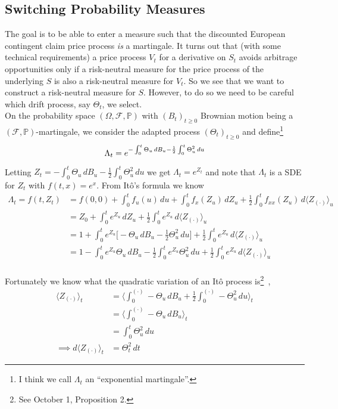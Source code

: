 \documentclass[12pt]{article}
\newlength\tindent
\renewcommand{\indent}{\hspace*{\tindent}}
\begin{document}
\subsection{Switching Probability Measures}

\indent The goal is to be able to enter a measure such that the discounted European contingent claim price process {\em is} a martingale. It turns out that (with some technical requirements) a price process $V_t$ for a derivative on $S_t$ avoids arbitrage opportunities only if a risk-neutral measure for the price process of the underlying $S$ is also a risk-neutral measure for $V_t$. So we see that we want to construct a risk-neutral measure for $S$. However, to do so we need to be careful which drift process, say $\Theta_t$, we select. \\

\indent On the probability space $(\Omega, \mathcal F,\mathbb P)$ with $(B_t)_{t\geq0}$ Brownian motion being a $(\mathcal F,\mathbb P)$-martingale, we consider the adapted process $(\Theta_t)_{t\geq0}$ and define\footnote{I think we call $\Lambda_t$ an ``exponential martingale''.}
\begin{equation*}
	\Lambda_t = e^{-\int^t_0\Theta_u\,dB_u - \frac{1}{2}\int^t_0 \Theta_u^2\,du } \\
\end{equation*}

\indent Letting $Z_t = -\int^t_0\Theta_u\,dB_u - \frac{1}{2}\int^t_0 \Theta_u^2\,du$ we get $\Lambda_t = e^{Z_t}$ and note that $\Lambda_t$ is a SDE for $Z_t$ with $f(t,x) = e^x$. From It\^{o}'s formula we know
\begin{align*}
	\Lambda_t = f(t,Z_t) &= f(0,0) + \int^t_0 f_u(u)\,du + \int^t_0 f_x(Z_u)\,dZ_u + \frac{1}{2}\int^t_0 f_{xx}(Z_u)\,d\langle Z_{(\cdot)}\rangle_u \\
	&= Z_0 + \int^t_0 e^{Z_u} \,dZ_u + \frac{1}{2}\int^t_0 e^{Z_u} \,d\langle Z_{(\cdot)}\rangle_u \\
	&= 1 + \int^t_0 e^{Z_u}\big[-\Theta_u\,dB_u - \frac{1}{2}\Theta_u^2\,du\big] + \frac{1}{2}\int^t_0 e^{Z_u} \,d\langle Z_{(\cdot)}\rangle_u \\
	&= 1 - \int^t_0 e^{Z_u}\Theta_u\,dB_u -  \frac{1}{2}\int^t_0 e^{Z_u} \Theta_u^2\,du + \frac{1}{2}\int^t_0 e^{Z_u} \,d\langle Z_{(\cdot)}\rangle_u \\
\end{align*}

Fortunately we know what the quadratic variation of an It\^{o} process is\footnote{See October 1, Proposition 2.}~, 
\begin{align*}
	\langle Z_{(\cdot)}\rangle_t &= \Big\langle \int^{(\cdot)}_0 -\Theta_u\,dB_u + \frac{1}{2}\int^{(\cdot)}_0 -\Theta^2_u\,du \Big\rangle_t \\
	&=  \Big\langle \int^{(\cdot)}_0 -\Theta_u\,dB_u \Big\rangle_t \\
	&= \int^t_0 \Theta_u^2\,du \\
	\implies d\langle Z_{(\cdot)}\rangle_t &= \Theta_t^2\,dt
\end{align*}
\end{document}
